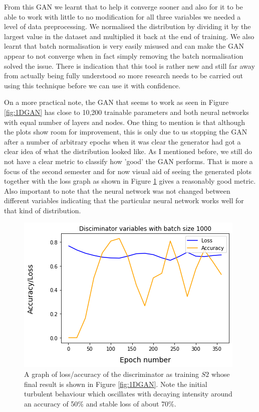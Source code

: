 \documentclass[11pt]{article} %
\begin{document}
From this GAN we learnt that to help it converge sooner and also for it to be able to work with little to no modification for all three variables we needed a level of data preprocessing. We normalised the distribution by dividing it by the largest value in the dataset and multiplied it back at the end of training. We also learnt that batch normalisation is very easily misused and can make the GAN appear to not converge when in fact simply removing the batch normalisation solved the issue. There is indication \cite{ioffe2015batch} that this tool is rather new and still far away from actually being fully understood so more research needs to be carried out using this technique before we can use it with confidence.
\newline

On a more practical note, the GAN that seems to work as seen in Figure \ref{fig:1DGAN} has close to 10,200 trainable parameters and both neural networks with equal number of layers and nodes. One thing to mention is that although the plots show room for improvement, this is only due to us stopping the GAN after a number of arbitrary epochs when it was clear the generator had got a clear idea of what the distribution looked like. As I mentioned before, we still do not have a clear metric to classify how 'good' the GAN performs. That is more a focus of the second semester and for now visual aid of seeing the generated plots together with the loss graph as shown in Figure \ref{fig:1DGANLoss} gives a reasonably good metric. Also important to note that the neural network was not changed between different variables indicating that the particular neural network works well for that kind of distribution.

\begin{figure}[H]
\centering
\includegraphics[scale=0.5]{images/1d_loss_graph_s2.png}
\caption{A graph of loss/accuracy of the discriminator as training $S2$ whose final result is shown in Figure \ref{fig:1DGAN}. Note the initial turbulent behaviour which oscillates with decaying intensity around an accuracy of 50\% and stable loss of about 70\%.}
\label{fig:1DGANLoss}
\end{figure}
\end{document}
